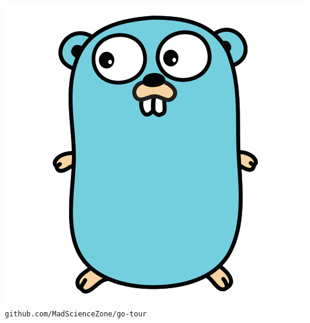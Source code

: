 \documentclass[pdf,t]{beamer}
\newcommand\z[1]{\texttt{#1}}
\begin{document}
\subsection{}
\begin{frame}{}
    \begin{center}
        \includegraphics[height=.85\textheight]{gopher}
        \z{github.com/MadScienceZone/go-tour}
    \end{center}
\end{frame}
\end{document}
